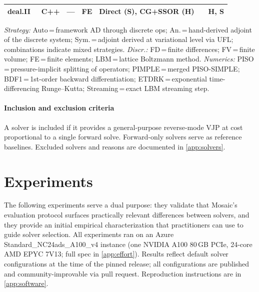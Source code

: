 \documentclass[11pt,a4paper]{article}
\begin{document}
\begin{table}[t]
{\begin{tabular}{@{}llllll c@{}}
    deal.II~\cite{bangerth2007dealii,arndt2023dealii}
      & C++ & --- & FE & Direct (S), CG+SSOR (H) & & H, S \\
    \bottomrule
  \end{tabular}}
  \par\vspace{4pt}
  \begin{minipage}{\linewidth}\footnotesize\raggedright
    \textit{Strategy:}
    Auto\,=\,framework AD through discrete ops;
    An.\,=\,hand-derived adjoint of the discrete system;
    Sym.\,=\,adjoint derived at variational level via UFL;
    combinations indicate mixed strategies.
    \textit{Discr.:}
    FD\,=\,finite differences;
    FV\,=\,finite volume;
    FE\,=\,finite elements;
    LBM\,=\,lattice Boltzmann method.
    \textit{Numerics:}
    PISO\,=\,pressure-implicit splitting of operators;
    PIMPLE\,=\,merged PISO-SIMPLE;
    BDF1\,=\,1st-order backward differentiation;
    ETDRK\,=\,exponential time-differencing Runge--Kutta;
    Streaming\,=\,exact LBM streaming step.
  \end{minipage}
\end{table}

\paragraph{Inclusion and exclusion criteria}
A solver is included if it provides a general-purpose reverse-mode VJP
at cost proportional to a single forward solve. Forward-only solvers
serve as reference baselines. Excluded solvers and reasons are documented
in \cref{app:solvers}.

\section{Experiments}
\label{sec:experiments}

The following experiments serve a dual purpose: they validate that
Mosaic's evaluation protocol surfaces practically relevant differences
between solvers, and they provide an initial empirical characterization
that practitioners can use to guide solver selection.
All experiments ran on an Azure Standard\_NC24ads\_A100\_v4 instance
(one NVIDIA A100 80\,GB PCIe, 24-core AMD EPYC 7V13; full spec in \cref{app:effort}).
Results reflect default solver configurations at the time of the pinned
release; all configurations are published and community-improvable via
pull request. Reproduction instructions are in \cref{app:software}.
\end{document}
